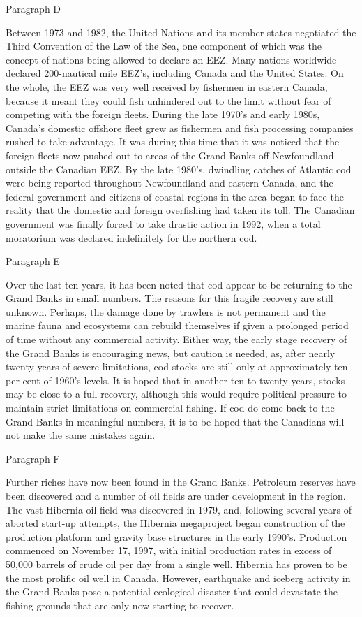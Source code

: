\documentclass{../templateReading/cdreading}
\begin{document}
Paragraph D

Between 1973 and 1982, the United Nations and its member states negotiated the Third Convention of the Law of the Sea, one component of which was the concept of nations being allowed to declare an EEZ. Many nations worldwide-declared 200-nautical mile EEZ’s, including Canada and the United States. On the whole, the EEZ was very well received by fishermen in eastern Canada, because it meant they could fish unhindered out to the limit without fear of competing with the foreign fleets. During the late 1970’s and early 1980s, Canada’s domestic offshore fleet grew as fishermen and fish processing companies rushed to take advantage. It was during this time that it was noticed that the foreign fleets now pushed out to areas of the Grand Banks off Newfoundland outside the Canadian EEZ. By the late 1980’s, dwindling catches of Atlantic cod were being reported throughout Newfoundland and eastern Canada, and the federal government and citizens of coastal regions in the area began to face the reality that the domestic and foreign overfishing had taken its toll. The Canadian government was finally forced to take drastic action in 1992, when a total moratorium was declared indefinitely for the northern cod.

Paragraph E

Over the last ten years, it has been noted that cod appear to be returning to the Grand Banks in small numbers. The reasons for this fragile recovery are still unknown. Perhaps, the damage done by trawlers is not permanent and the marine fauna and ecosystems can rebuild themselves if given a prolonged period of time without any commercial activity. Either way, the early stage recovery of the Grand Banks is encouraging news, but caution is needed, as, after nearly twenty years of severe limitations, cod stocks are still only at approximately ten per cent of 1960’s levels. It is hoped that in another ten to twenty years, stocks may be close to a full recovery, although this would require political pressure to maintain strict limitations on commercial fishing. If cod do come back to the Grand Banks in meaningful numbers, it is to be hoped that the Canadians will not make the same mistakes again.

Paragraph F

Further riches have now been found in the Grand Banks. Petroleum reserves have been discovered and a number of oil fields are under development in the region. The vast Hibernia oil field was discovered in 1979, and, following several years of aborted start-up attempts, the Hibernia megaproject began construction of the production platform and gravity base structures in the early 1990’s. Production commenced on November 17, 1997, with initial production rates in excess of 50,000 barrels of crude oil per day from a single well. Hibernia has proven to be the most prolific oil well in Canada. However, earthquake and iceberg activity in the Grand Banks pose a potential ecological disaster that could devastate the fishing grounds that are only now starting to recover.
\end{document}
